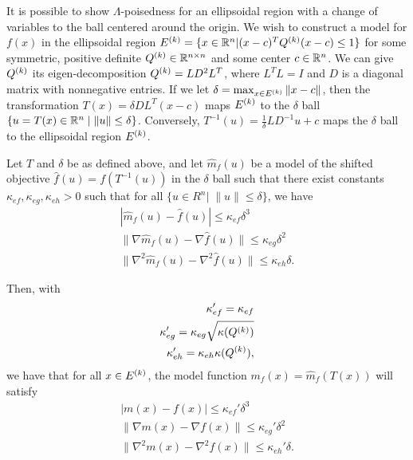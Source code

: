 It is possible to show $\Lambda$-poisedness for an ellipsoidal region with a change of variables to the ball centered around the origin.
We wish to construct a model for $f(x)$ in the ellipsoidal region
${E^{(k)}} = \{x \in \mathbb R^n | (x - c)^T{Q^{(k)}}(x - c) \le 1\}$ for some symmetric, positive definite
${Q^{(k)}} \in \mathbb R^{n\times n}$ and some center $c \in \mathbb R^n$.
We can give ${Q^{(k)}}$ its eigen-decomposition ${Q^{(k)}} = L D^2 L^T$, where $L^TL = I$ and $D$ is a diagonal matrix with nonnegative entries.
If we let $\delta = \max_{x\in {E^{(k)}}}\|x-c\|$, then the transformation $T(x) = \delta DL^T(x - c)$ maps $ {E^{(k)}} $ to the $\delta$ ball $\{u = T(x) \in \mathbb R^n \; | \; \|u\| \le \delta\}$.
Conversely, $ T^{-1}(u) = \frac 1 {\delta} LD^{-1}u + c$ maps the $\delta$ ball to the ellipsoidal region $ {E^{(k)}} $.


\begin{theorem}
\label{shifted_ellipsoid}
Let $T$ and $\delta$ be as defined above, and let $\hat m_f(u)$ be a model of the shifted objective $\hat f(u) = f(T^{-1}(u))$ in the $\delta$ ball such that
there exist constants $\kappa_{ef}, \kappa_{eg}, \kappa_{eh} > 0$ such that for all $\{u \in R^n | \;\|u\| \le \delta \}$, we have
\begin{align*}
|\hat m_f(u) - \hat f(u)| \le \kappa_{ef} \delta^3\\
\|\nabla \hat m_f(u) - \nabla \hat f(u)\| \le \kappa_{eg}\delta^2\\
\|\nabla^2 \hat m_f(u) - \nabla^2 \hat f(u)\| \le \kappa_{eh}\delta.
\end{align*}

Then, with
\begin{align*}
\kappa_{ef}' = \kappa_{ef} \\
\kappa_{eg}' = \kappa_{eg}\sqrt{\kappa({Q^{(k)}})} \\
\kappa_{eh}' = \kappa_{eh}\kappa({Q^{(k)}}),
\end{align*}
we have that for all $x \in {E^{(k)}}$,
the model function $m_f(x) = \hat m_f(T(x))$ will satisfy
\begin{align*}
| m(x) - f(x)| \le \kappa_{ef}'\delta^3 \\
\|\nabla  m(x) - \nabla  f(x)\| \le \kappa_{eg}'\delta^2 \\
\|\nabla^2 m(x) - \nabla^2 f(x)\| \le \kappa_{eh}'\delta.
\end{align*}
\end{theorem}

